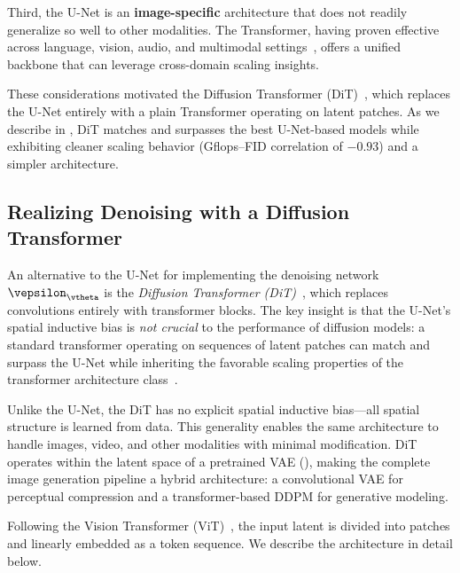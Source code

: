 \documentclass[../../book-main.tex]{subfiles}
\begin{document}
Third, the U-Net is an \textbf{image-specific} architecture that does not readily generalize so well to other modalities.
The Transformer, having proven effective across language, vision, audio, and multimodal settings~\citep{vaswani2017attention}, offers a unified backbone that can leverage cross-domain scaling insights.

These considerations motivated the Diffusion Transformer (DiT)~\citep{peebles2023scalable}, which replaces the U-Net entirely with a plain Transformer operating on latent patches.
As we describe in , DiT matches and surpasses the best U-Net-based models while exhibiting cleaner scaling behavior (Gflops--FID correlation of \(-0.93\)) and a simpler architecture.

\subsection{Realizing Denoising with a Diffusion Transformer}
\label{sec:DiT-implement}

An alternative to the U-Net for implementing the denoising network \(\vepsilon_{\vtheta}\) is the \textit{Diffusion Transformer (DiT)}~\citep{peebles2023scalable}, which replaces convolutions entirely with transformer blocks.
The key insight is that the U-Net's spatial inductive bias is \textit{not crucial} to the performance of diffusion models: a standard transformer operating on sequences of latent patches can match and surpass the U-Net while inheriting the favorable scaling properties of the transformer architecture class~\citep{vaswani2017attention}.

Unlike the U-Net, the DiT has no explicit spatial inductive bias---all spatial structure is learned from data.
This generality enables the same architecture to handle images, video, and other modalities with minimal modification.
DiT operates within the latent space of a pretrained VAE (), making the complete image generation pipeline a hybrid architecture: a convolutional VAE for perceptual compression and a transformer-based DDPM for generative modeling.

Following the Vision Transformer (ViT)~\citep{dosovitskiy2020image}, the input latent is divided into patches and linearly embedded as a token sequence.
We describe the architecture in detail below.
\end{document}
